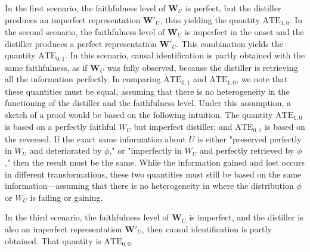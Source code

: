 \documentclass[11pt]{article}
\newcommand{\bW}{\bm{W}}  %
\begin{document}
 In the first scenario, the faithfulness level of $\bW_U$ is perfect, but the distiller produces an imperfect representation $\bm{W'}_U$, thus yielding the quantity $\textrm{ATE}_{1,0}$. In the second scenario, the faithfulness level of $\bW_U$ is imperfect in the onset and the distiller produces a perfect representation $\bm{W'}_U$. This combination yields the quantity $\textrm{ATE}_{0,1}$. In this scenario, causal identification is partly obtained with the same faithfulness, as if $\bW_U$ was fully observed, because the distiller is retrieving all the information perfectly. In comparing $\textrm{ATE}_{0,1}$ and $\textrm{ATE}_{1,0}$, we note that these quantities must be equal, assuming that there is no heterogeneity in the functioning of the distiller and the faithfulness level. Under this assumption, a sketch of a proof would be based on the following intuition. The quantity $\textrm{ATE}_{1,0}$ is based on a perfectly faithful $W_U$ but imperfect distiller; and $\textrm{ATE}_{0,1}$ is based on the reversed. If the exact same information about $U$ is either "preserved perfectly in $W_U$ and deteriorated by $\phi$," or "imperfectly in $W_U$ and perfectly retrieved by $\phi$," then the result must be the same. While the information gained and lost occurs in different transformations, these two quantities must still be based on the same information---assuming that there is no heterogeneity in where the distribution $\phi$ or $W_U$ is failing or gaining.

 In the third scenario, the faithfulness level of $\bW_U$ is imperfect, and the distiller is also an imperfect representation $\bm{W'}_U$, then causal identification is partly obtained. That quantity is $\textrm{ATE}_{0,0}$.




\end{document}
